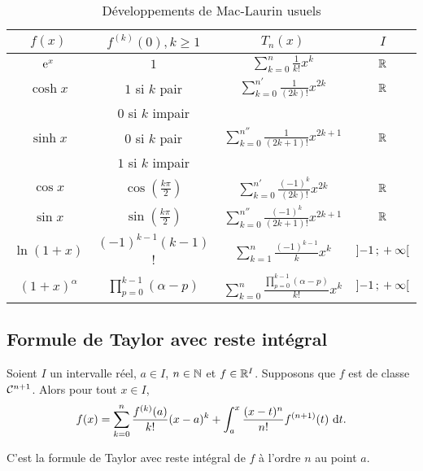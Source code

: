 \begin{table}[!h]
  \centering
  \begin{tabular}{|c|c|c|c|}\hline
    \(f(x)\) &  \(f^{(k)}(0), k\geqslant 1\) & \(T_n(x)\) & \(I\) \\ \hline
    \(\operatorname{e}^x\) &  \(1\) & \(\sum_{k = 0}^n \frac{1}{k!}x^k\) & \(\mathbb{R}\) \\ \hline
    \(\cosh x\)  & \(1\) si \(k\) pair & \(\sum_{k = 0}^{n'} 
    \frac{1}{(2k)!}x^{2k}\) & \(\mathbb{R}\) \\
    &  \(0\) si \(k\) impair & & \\ \hline
    \(\sinh x\)  & \(0\) si \(k\) pair & \(\sum_{k = 0}^{n''} 
    \frac{1}{(2k+1)!}x^{2k+1}\) & \(\mathbb{R}\) \\
    &  \(1\) si \(k\) impair & & \\ \hline
    \(\cos x\)  & \(\cos\left(\frac{k\pi}{2}\right)\) & \(\sum_{k = 0}^{n'} 
    \frac{(-1)^k}{(2k)!}x^{2k}\) & \(\mathbb{R}\) \\ \hline
    \(\sin x\)  & \(\sin\left(\frac{k\pi}{2}\right)\) & \(\sum_{k = 0}^{n''} 
    \frac{(-1)^k}{(2k+1)!}x^{2k+1}\) & \(\mathbb{R}\) \\ \hline
    \(\ln(1+x)\)  & \((-1)^{k-1}(k-1)\)! & \(\sum_{k = 1}^n \frac{(-1)^{k-1}}{k} 
    x^k\) & \(\left] -1 \, ; {} +\infty \right[\) \\ \hline
    \((1+x)^\alpha\) & \(\prod_{p = 0}^{k-1} (\alpha-p)\) & \(\sum_{k = 0}^n 
    \frac{\prod_{p = 0}^{k-1} (\alpha-p)}{k!} x^k\) & 
    \(\left] -1 \, ; {} +\infty \right[\) \\ \hline
  \end{tabular}
  \caption{Développements de Mac-Laurin usuels}
  \label{tab:MacLaurin}
\end{table}

\subsection{Formule de Taylor avec reste intégral}

\begin{theo}
  Soient \(I\) un intervalle réel, \(a \in I\), \(n \in \mathbb{N}\) et \(f \in \mathbb{R}^I\). 
  Supposons que \(f\) est de classe \(\mathcal{C}^{n+1}\). Alors pour tout \(x \in 
  I\),
  \begin{equation}
    f(x) = \sum_{k = 0}^n \frac{f^{(k)}(a)}{k!} (x-a)^k + \int_a^x 
    \frac{(x-t)^n}{n!} f^{(n+1)}(t)\,\mathop{}\mathopen{}\mathrm{d} t.
  \end{equation}

  C'est la formule de Taylor avec reste intégral de \(f\) à l'ordre \(n\) au 
  point \(a\).
\end{theo}

